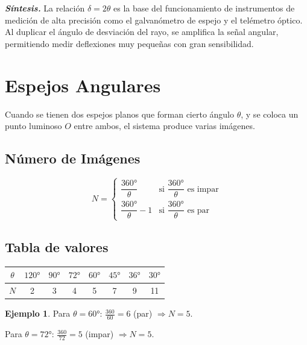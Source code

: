 \documentclass[12pt, a4paper]{article}
\theoremstyle{definition}
\newtheorem{ejemplo}{Ejemplo}[section]
\begin{document}
\textit{\textbf{Síntesis.}} La relación \(\delta = 2\theta\) es la base del funcionamiento de instrumentos de medición de alta precisión como el galvanómetro de espejo y el telémetro óptico. Al duplicar el ángulo de desviación del rayo, se amplifica la señal angular, permitiendo medir deflexiones muy pequeñas con gran sensibilidad.

\section{Espejos Angulares}

Cuando se tienen dos espejos planos que forman cierto ángulo \(\theta\), y se coloca un punto luminoso \(O\) entre ambos, el sistema produce varias imágenes.

\subsection{Número de Imágenes}

\begin{equation}
  N = \begin{cases}
    \dfrac{360°}{\theta} & \text{si } \dfrac{360°}{\theta} \text{ es impar} \\[10pt]
    \dfrac{360°}{\theta} - 1 & \text{si } \dfrac{360°}{\theta} \text{ es par}
  \end{cases}
  \label{eq:espejos_angulares}
\end{equation}

\subsection{Tabla de valores}

\begin{center}
\begin{tabular}{@{}cccccccc@{}}
\toprule
\(\theta\) & \(120°\) & \(90°\) & \(72°\) & \(60°\) & \(45°\) & \(36°\) & \(30°\) \\
\midrule
\(N\)      & 2        & 3       & 4       & 5       & 7       & 9       & 11      \\
\bottomrule
\end{tabular}
\end{center}

\begin{ejemplo}
Para \(\theta = 60°\): \(\frac{360}{60} = 6\) (par) \(\Rightarrow N = 5\).

Para \(\theta = 72°\): \(\frac{360}{72} = 5\) (impar) \(\Rightarrow N = 5\).
\end{ejemplo}
\end{document}
